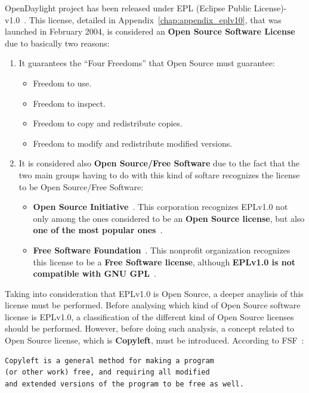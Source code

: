 \documentclass[a4paper, 12pt]{book}
\begin{document}
OpenDaylight project has been released under EPL (Eclipse Public License)-v1.0~\cite{EPLv1}. This license, detailed in Appendix~\ref{chap:appendix_eplv10}, that was launched in February 2004, is considered an \textbf{Open Source Software License} due to basically two reasons:
\begin{enumerate}\itemsep0pt
 \item {It guarantees the ``Four Freedoms'' that Open Source must guarantee}:
  \begin{itemize}\itemsep0pt
   \item{Freedom to use}.
   \item{Freedom to inspect}.
   \item{Freedom to copy and redistribute copies}.
   \item{Freedom to modify and redistribute modified versions}.
  \end{itemize}
 \item {It is considered also \textbf{Open Source/Free Software} due to the fact that the two main groups having to do with this kind of softare recognizes the license to be Open Source/Free Software}:
  \begin{itemize}\itemsep0pt
   \item{\textbf{Open Source Initiative}~\cite{OpenSourceInitiative}}. This corporation recognizes EPLv1.0 not only among the ones considered to be an \textbf{Open Source license}, but also \textbf{one of the most popular ones}~\cite{OSILicenses}.
   \item{\textbf{Free Software Foundation}~\cite{FreeSoftwareFoundation}}. This nonprofit organization recognizes this license to be a \textbf{Free Software license}, although \textbf{EPLv1.0 is not compatible with GNU GPL}~\cite{FSFLicense}.
  \end{itemize}
\end{enumerate}
Taking into consideration that EPLv1.0 is Open Source, a deeper anaylisis of this license must be performed. Before analysing which kind of Open Source software license is EPLv1.0, a classification of the different kind of Open Source licenses should be performed. However, before doing such analysis, a concept related to Open Source license, which is \textbf{Copyleft}, must be introduced. According to FSF~\cite{FSFCopyleft}:
\begin{verbatim}
Copyleft is a general method for making a program
(or other work) free, and requiring all modified
and extended versions of the program to be free as well.
\end{verbatim}
\end{document}
